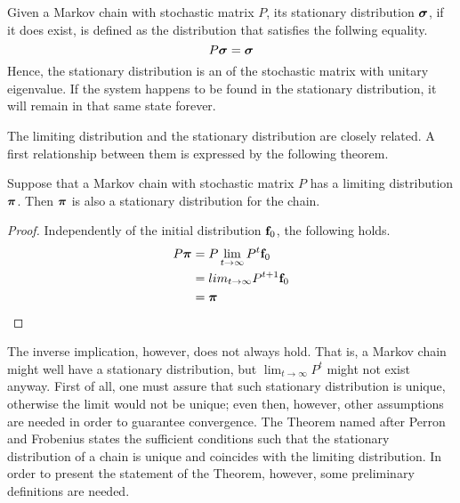 \begin{ndef} 
    Given a Markov chain with stochastic matrix $P$, its stationary distribution $\boldsymbol{\sigma}$, if it does exist, is defined as the distribution that satisfies the follwing equality.
    \begin{equation}
        P \boldsymbol{\sigma} = \boldsymbol{\sigma}
    \end{equation}
    Hence, the stationary distribution is an  of the stochastic matrix with unitary eigenvalue. If the system happens to be found in the stationary distribution, it will remain in that same state forever.
\end{ndef}
The limiting distribution and the stationary distribution are closely related. A first relationship between them is expressed by the following theorem.

\begin{theorem} \label{th:limit-stat}
    Suppose that a Markov chain with stochastic matrix $P$ has a limiting distribution $\boldsymbol{\pi}$. Then $\boldsymbol{\pi}$ is also a stationary distribution for the chain.
\end{theorem}
\begin{proof}
    Independently of the initial distribution $\mathbf{f}_0$, the following holds.
    \begin{align}
        P \boldsymbol{\pi}
         & = P \lim_{t \rightarrow \infty} P^t \mathbf{f}_0  \\
         & = lim_{t \rightarrow \infty} P^{t+1} \mathbf{f}_0 \\
         & = \boldsymbol{\pi}
    \end{align}
\end{proof}
The inverse implication, however, does not always hold. That is, a Markov chain might well have a stationary distribution, but $\lim_{t \rightarrow \infty} P^t$ might not exist anyway. First of all, one must assure that such stationary distribution is unique, otherwise the limit would not be unique; even then, however, other assumptions are needed in order to guarantee convergence. The Theorem named after Perron and Frobenius states the sufficient conditions such that the stationary distribution of a chain is unique and coincides with the limiting distribution. In order to present the statement of the Theorem, however, some preliminary definitions are needed. 

